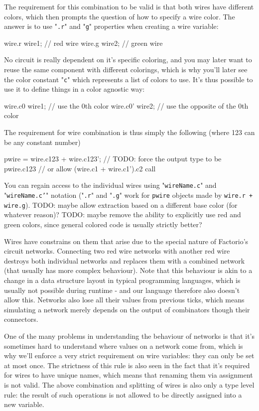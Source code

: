 \documentclass[landscape]{article}
\theoremstyle{plain}
\theoremstyle{definition}
\begin{document}
The requirement for this combination to be valid is that both wires have different colors, which then prompts the question of how to specify a wire color. The answer is to use "\texttt{.r}" and "\texttt{g}" properties when creating a wire variable:
\begin{langname}
wire.r wire1;  // red wire
wire.g wire2;  // green wire
\end{langname}
No circuit is really dependent on it's specific coloring, and you may later want to reuse the same component with different colorings, which is why you'll later see the color constant "\texttt{c}" which represents a list of colors to use. It's thus possible to use it to define things in a color agnostic way:
\begin{langname}
wire.c0 wire1;   // use the 0th color
wire.c0' wire2;  // use the opposite of the 0th color
\end{langname}
The requirement for wire combination is thus simply the following (where 123 can be any constant number)
\begin{langname}
pwire = wire.c123 + wire.c123';  // TODO: force the output type to be pwire.c123
                                 // or allow (wire.c1 + wire.c1').c2 call
\end{langname}
You can regain access to the individual wires using "\texttt{wireName.c}" and "\texttt{wireName.c'}" notation ("\texttt{.r}" and "\texttt{.g}" work for \texttt{pwire} objects made by \texttt{wire.r + wire.g}). TODO: maybe allow extraction based on a different base color (for whatever reason)? TODO: maybe remove the ability to explicitly use red and green colors, since general colored code is usually strictly better?

Wires have constrains on them that arise due to the special nature of Factorio's circuit networks. Connecting two red wire networks with another red wire destroys both individual networks and replaces them with a combined network (that usually has more complex behaviour). Note that this behaviour is akin to a change in a data structure layout in typical programming languages, which is usually not possible during runtime - and our language therefore also doesn't allow this. Networks also lose all their values from previous ticks, which means simulating a network merely depends on the output of combinators though their connectors.

One of the many problems in understanding the behaviour of networks is that it's sometimes hard to understand where values on a network come from, which is why we'll enforce a very strict requirement on wire variables: they can only be set at most once. The strictness of this rule is also seen in the fact that it's required for wires to have unique names, which means that renaming them via assignment is not valid. The above combination and splitting of wires is also only a type level rule: the result of such operations is not allowed to be directly assigned into a new variable.
\end{document}
